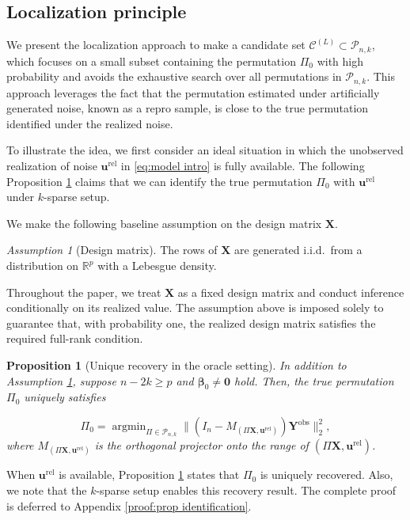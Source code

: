 \documentclass[11pt, reqno]{amsart}
\newcommand{\R}{\mathbb{R}}
\renewcommand{\ge}{\geqslant}
\newcommand{\mC}{\mathcal{C}}
\newcommand{\mP}{\mathcal{P}}
\newcommand{\1}{\mbox{1}\hspace{-0.25em}\mbox{l}}
\newcommand{\obs}{\mathrm{obs}}
\newcommand{\rel}{\mathrm{rel}}
\DeclareMathOperator*{\argmin}{argmin}
\theoremstyle{definition}\newtheorem{problem}{Problem}[section]
\theoremstyle{definition}\newtheorem{definition}[problem]{Definition}
\theoremstyle{remark}\newtheorem{assumption}{Assumption}
\theoremstyle{remark}\newtheorem{remark}[problem]{Remark}
\theoremstyle{definition}\newtheorem{example}[problem]{Example}
\theoremstyle{plain}\newtheorem{theorem}[problem]{Theorem}
\theoremstyle{plain}\newtheorem{question}[problem]{Question}
\theoremstyle{plain}\newtheorem{lemma}[problem]{Lemma}
\theoremstyle{plain}\newtheorem{proposition}[problem]{Proposition}
\theoremstyle{plain}\newtheorem{corollary}[problem]{Corollary}
\theoremstyle{plain}\newtheorem{conjecture}[problem]{Conjecture}
\begin{document}
\subsection{Localization principle}\label{subsec:candidate}


We present the localization approach to make a candidate set $\mC^{(L)}\subset\mP_{n,k}$, which focuses on a small subset containing the permutation $\Pi_0$ with high probability and avoids the exhaustive search over all permutations in $\mP_{n,k}$.
This approach leverages the fact that the permutation estimated under artificially generated noise, known as a repro sample, is close to the true permutation identified under the realized noise.

To illustrate the idea, we first consider an ideal situation in which the unobserved realization of noise $\bm{u}^{\rel}$ in \eqref{eq:model intro} is fully available. The following Proposition \ref{prop:identification} claims that we can identify the true permutation $\Pi_0$ with $\bm{u}^{\rel}$ under $k$-sparse setup. 


We make the following baseline assumption on the design matrix $\bm X$.
\begin{assumption}[Design matrix]\label{ass:generic-design}
The rows of $\bm X$ are generated i.i.d.\ from a distribution on
$\R^p$ with a Lebesgue density.
\end{assumption}
Throughout the paper, we treat $\bm X$ as a fixed design matrix and
conduct inference conditionally on its realized value.
The assumption above is imposed solely to guarantee that, with
probability one, the realized design matrix satisfies the required
full-rank condition.




\begin{proposition}[Unique recovery in the oracle setting]\label{prop:identification}
    In addition to Assumption \ref{ass:generic-design}, suppose $n-2k \ge p$ and $\bm\beta_0\neq \bm 0$ hold. Then, the true permutation $\Pi_0$ uniquely satisfies 

\begin{equation}\label{eq:repro_ideal_Pi}
   \Pi_0 = \argmin_{\Pi \in \mP_{n,k}}\| (I_n - M_{(\Pi \bm{X}, \bm{u}^{\rel})}) \bm{Y}^{\obs}\|_2^2,
\end{equation}
where $M_{(\Pi \bm{X}, \bm{u}^{\rel})}$ is the orthogonal projector onto the range of $(\Pi \bm{X}, \bm{u}^{\rel})$. 
\end{proposition}

When $\bm{u}^{\rel}$ is available, Proposition \ref{prop:identification} states that $\Pi_0$ is uniquely recovered. Also, we note that the $k$-sparse setup enables this recovery result. The complete proof is deferred to Appendix \ref{proof:prop identification}.
\end{document}
